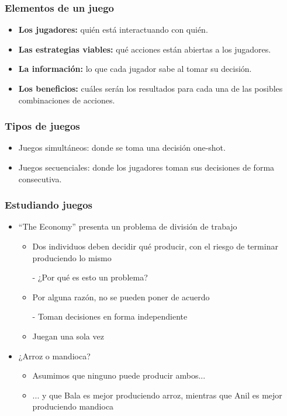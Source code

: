 \documentclass{beamer}
\begin{document}
\begin{frame}
\frametitle{Elementos de un juego}
\begin{itemize}
\item \textbf{Los jugadores:} quién está interactuando con quién.\vspace{4mm}
\item \textbf{Las estrategias viables:} qué acciones están abiertas a los jugadores.\vspace{4mm}
\item \textbf{La información:} lo que cada jugador sabe al tomar su decisión.\vspace{4mm}
\item \textbf{Los beneficios:} cuáles serán los resultados para cada una de las posibles combinaciones de acciones.\vspace{4mm}
\end{itemize}
\end{frame}

\begin{frame}
\frametitle{Tipos de juegos}
\begin{itemize}
\item Juegos simultáneos: donde se toma una decisión one-shot.\vspace{4mm}
\item Juegos secuenciales: donde los jugadores toman sus decisiones de forma consecutiva.\vspace{4mm}
\end{itemize}
\end{frame}


\begin{frame}
\frametitle{ Estudiando juegos}
\begin{itemize}
\item “The Economy” presenta un problema de división de trabajo
\begin{itemize}
    \item Dos individuos deben decidir qué producir, con el riesgo de terminar produciendo lo mismo
        \begin{itemize}
        - ¿Por qué es esto un problema?
        \end{itemize}
        \item Por alguna razón, no se pueden poner de acuerdo
        \begin{itemize}
        - Toman decisiones en forma independiente
        \end{itemize}
        \item Juegan una sola vez
        \end{itemize}
    \item ¿Arroz o mandioca?
        \begin{itemize}
        \item Asumimos que ninguno puede producir ambos...
        \item ... y que Bala es mejor produciendo arroz, mientras que Anil es mejor produciendo mandioca
    \end{itemize}
\end{itemize}
\end{frame}
\end{document}
